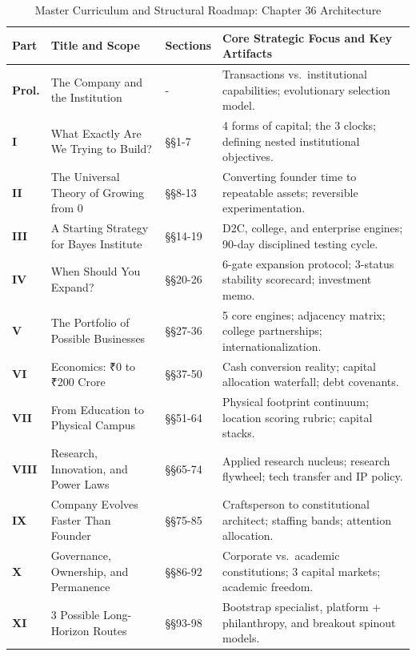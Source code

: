 \begin{table}[t]
\centering
\small
\caption{Master Curriculum and Structural Roadmap: Chapter 36 Architecture}
\label{tab:ch36_reading_map}
\begin{tabularx}{\textwidth}{p{1.2cm} p{4.2cm} p{1.6cm} X}
\toprule
\textbf{Part} & \textbf{Title and Scope} & \textbf{Sections} & \textbf{Core Strategic Focus and Key Artifacts} \\
\midrule
\textbf{Prol.} & The Company and the Institution & - & Transactions vs.\ institutional capabilities; evolutionary selection model. \\
\textbf{I} & What Exactly Are We Trying to Build? & \S\S 1-7 & 4 forms of capital; the 3 clocks; defining nested institutional objectives. \\
\textbf{II} & The Universal Theory of Growing from 0 & \S\S 8-13 & Converting founder time to repeatable assets; reversible experimentation. \\
\textbf{III} & A Starting Strategy for Bayes Institute & \S\S 14-19 & D2C, college, and enterprise engines; 90-day disciplined testing cycle. \\
\textbf{IV} & When Should You Expand? & \S\S 20-26 & 6-gate expansion protocol; 3-status stability scorecard; investment memo. \\
\textbf{V} & The Portfolio of Possible Businesses & \S\S 27-36 & 5 core engines; adjacency matrix; college partnerships; internationalization. \\
\textbf{VI} & Economics: \textnormal{₹}0 to \textnormal{₹}200 Crore & \S\S 37-50 & Cash conversion reality; capital allocation waterfall; debt covenants. \\
\textbf{VII} & From Education to Physical Campus & \S\S 51-64 & Physical footprint continuum; location scoring rubric; capital stacks. \\
\textbf{VIII} & Research, Innovation, and Power Laws & \S\S 65-74 & Applied research nucleus; research flywheel; tech transfer and IP policy. \\
\textbf{IX} & Company Evolves Faster Than Founder & \S\S 75-85 & Craftsperson to constitutional architect; staffing bands; attention allocation. \\
\textbf{X} & Governance, Ownership, and Permanence & \S\S 86-92 & Corporate vs.\ academic constitutions; 3 capital markets; academic freedom. \\
\textbf{XI} & 3 Possible Long-Horizon Routes & \S\S 93-98 & Bootstrap specialist, platform + philanthropy, and breakout spinout models. \\

\end{tabularx}
\end{table}
